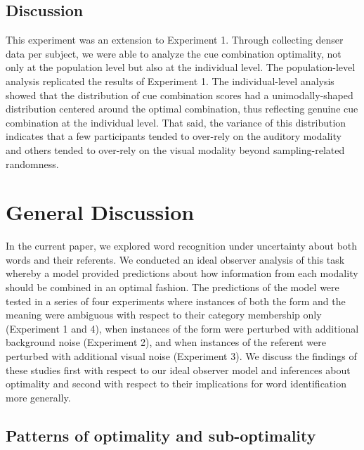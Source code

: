 \documentclass[english,,man,floatsintext]{apa6}
\theoremstyle{definition}
\theoremstyle{definition}
\theoremstyle{definition}
\theoremstyle{remark}
\begin{document}
\subsection{Discussion}\label{discussion-3}

This experiment was an extension to Experiment 1. Through collecting
denser data per subject, we were able to analyze the cue combination
optimality, not only at the population level but also at the individual
level. The population-level analysis replicated the results of
Experiment 1. The individual-level analysis showed that the distribution
of cue combination scores had a unimodally-shaped distribution centered
around the optimal combination, thus reflecting genuine cue combination
at the individual level. That said, the variance of this distribution
indicates that a few participants tended to over-rely on the auditory
modality and others tended to over-rely on the visual modality beyond
sampling-related randomness.

\section{General Discussion}\label{general-discussion}

In the current paper, we explored word recognition under uncertainty
about both words and their referents. We conducted an ideal observer
analysis of this task whereby a model provided predictions about how
information from each modality should be combined in an optimal fashion.
The predictions of the model were tested in a series of four experiments
where instances of both the form and the meaning were ambiguous with
respect to their category membership only (Experiment 1 and 4), when
instances of the form were perturbed with additional background noise
(Experiment 2), and when instances of the referent were perturbed with
additional visual noise (Experiment 3). We discuss the findings of these
studies first with respect to our ideal observer model and inferences
about optimality and second with respect to their implications for word
identification more generally.

\subsection{Patterns of optimality and
sub-optimality}\label{patterns-of-optimality-and-sub-optimality}
\end{document}
